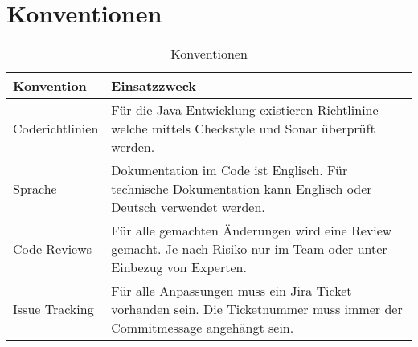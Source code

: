 \section{Konventionen}

\begin{table}[H]
	\centering
	\caption{Konventionen}
	\begin{tabular}{ | p{4cm} | p{12cm} | }
		\toprule
		{\textbf{Konvention}} & {\textbf{Einsatzzweck}} \\
		\midrule
		Coderichtlinien & Für die Java Entwicklung existieren Richtlinine welche mittels Checkstyle und Sonar überprüft werden. \\ \hline
		Sprache & Dokumentation im Code ist Englisch. Für technische Dokumentation kann Englisch oder Deutsch verwendet werden.\\ \hline
		Code Reviews & Für alle gemachten Änderungen wird eine Review gemacht. Je nach Risiko nur im Team oder unter Einbezug von Experten.\\ \hline
		Issue Tracking & Für alle Anpassungen muss ein Jira Ticket vorhanden sein. Die Ticketnummer muss immer der Commitmessage angehängt sein.\\	
		\bottomrule
	\end{tabular}
\end{table}